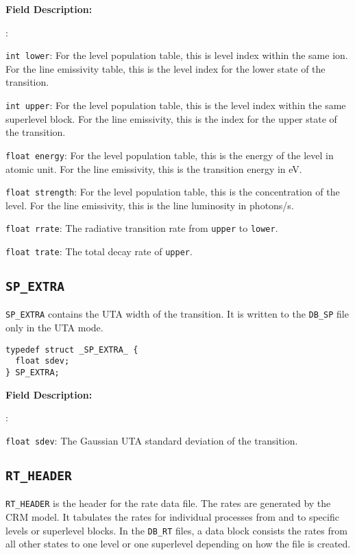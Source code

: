 \documentclass[twoside,letterpaper]{refrep}
\newcommand{\key}[1]{\texttt{#1}}
\newenvironment{dbdesc}{\textbf{Field Description:} \begin{list}
	{:}{\setlength{\labelwidth}{2in}
	   \setlength{\leftmargin}{2in}
	   \setlength{\labelsep}{0.1in}
	   \setlength{\rightmargin}{0.2in}}}
	{\end{list}}
\begin{document}
\begin{dbdesc}
\item[\texttt{int lower}:] For the level population table, this is level index
within the same ion. For the line emissivity table, this is the level index for
the lower state of the transition.
\item[\texttt{int upper}:] For the level population table, this is the level
index within the same superlevel block. For the line emissivity, this is the
index for the upper state of the transition.
\item[\texttt{float energy}:] For the level population table, this is the
energy of the level in atomic unit. For the line emissivity, this is the
transition energy in eV.
\item[\texttt{float strength}:] For the level population table, this is the
concentration of the level. For the line emissivity, this is the line
luminosity in photons/s. 
\item[\texttt{float rrate}:] The radiative transition rate from \key{upper} to
  \key{lower}. 
\item[\texttt{float trate}:] The total decay rate of \key{upper}.
\end{dbdesc}

\subsection{\texttt{SP\_EXTRA}}
\texttt{SP\_EXTRA} contains the UTA width of the transition. It is written to
the \texttt{DB\_SP} file only in the UTA mode.

\begin{verbatim}
typedef struct _SP_EXTRA_ {
  float sdev;
} SP_EXTRA;
\end{verbatim}

\begin{dbdesc}
\item[\texttt{float sdev}:] The Gaussian UTA standard deviation of the
  transition.
\end{dbdesc}

\subsection{\texttt{RT\_HEADER}}
\label{subsec:rt_header}
\texttt{RT\_HEADER} is the header for the rate data file. The rates are
generated by the CRM model. It tabulates the rates for individual processes
from and to specific levels or superlevel blocks. In the \texttt{DB\_RT}
files, a data block consists the rates from all other states to one level or
one superlevel depending on how the file is created.
\end{document}
